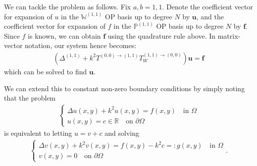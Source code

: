\documentclass[11pt, oneside]{article}   	%
\newcommand{\R}{\mathbb{R}}
\newcommand{\bigPii}{{\mathbb{P}^{(1,1)}}}
\newcommand{\bigWii}{{\mathbb{W}^{(1,1)}}}
\begin{document}
We can tackle the problem as follows. Fix \(a, b = 1,1\). Denote the coefficient vector for expansion of $u$ in the $\bigWii$ OP basis up to degree $N$ by $\mathbf{u}$, and the coefficient vector for expansion of $f$ in the $\bigPii$ OP basis up to degree $N$ by $\mathbf{f}$. Since $f$ is known, we can obtain $\mathbf{f}$ using the quadrature rule above. In matrix-vector notation, our system hence becomes:
\begin{align}
    (\Delta^{(1,1)} + k^2 T^{(0,0)\to(1,1)} T_W^{(1,1)\to(0,0)}) \mathbf{u} = \mathbf{f}
\end{align}
which can be solved to find $\mathbf{u}$.

We can extend this to constant non-zero boundary conditions by simply noting that the problem 
\begin{align}
	\begin{cases}
    		\Delta u(x,y) + k^2 u(x,y) = f(x,y) \quad \text{in } \Omega \\
		u(x,y) = c \in \R \quad \text{on } \partial \Omega
	\end{cases}
\end{align}
is equivalent to letting $u = v + c$ and solving
\begin{align}
	\begin{cases}
    		\Delta v(x,y) + k^2 v(x,y) = f(x,y) - k^2 c =: g(x,y)  \quad \text{in } \Omega \\
		v(x,y) = 0 \quad \text{on } \partial \Omega
	\end{cases}.
\end{align}
\end{document}
